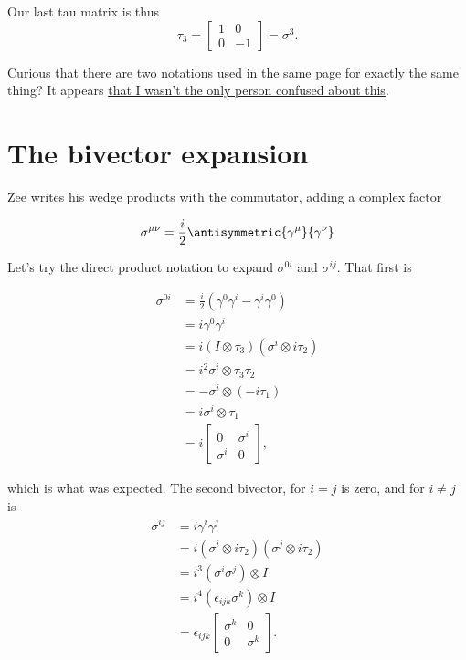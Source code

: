 Our last tau matrix is thus
\begin{equation}\label{eqn:zeeTauMatrix:130}
\tau_3 = 
\begin{bmatrix}
1 & 0 \\
0 & -1
\end{bmatrix}
= \sigma^3.
\end{equation}

Curious that there are two notations used in the same page for exactly the same thing?  It appears \href{http://www.physicsforums.com/showthread.php?p=2844657}{that I wasn't the only person confused about this}.

\section{The bivector expansion}

Zee writes his wedge products with the commutator, adding a complex factor

\begin{equation}\label{eqn:zeeTauMatrix:140}
\sigma^{\mu\nu} = \frac{i}{2} \antisymmetric{\gamma^\mu}{\gamma^\nu}
\end{equation}

Let's try the direct product notation to expand $\sigma^{0 i}$ and $\sigma^{ij}$.  That first is

\begin{align*}
\sigma^{0 i} 
&= \frac{i}{2} \left( \gamma^0 \gamma^i - \gamma^i \gamma^0 \right) \\
&= i \gamma^0 \gamma^i \\
&= i (I \otimes \tau_3)(\sigma^i \otimes i \tau_2) \\
&= i^2 \sigma^i \otimes \tau_3\tau_2 \\
&= - \sigma^i \otimes (-i \tau_1) \\
&= i \sigma^i \otimes \tau_1 \\
&= i 
\begin{bmatrix}
0 & \sigma^i \\
\sigma^i & 0
\end{bmatrix},
\end{align*}

which is what was expected.  The second bivector, for $i=j$ is zero, and for $i\ne j$ is
\begin{align*}
\sigma^{i j} 
&= i \gamma^i \gamma^j \\
&= i (\sigma^i \otimes i \tau_2) (\sigma^j \otimes i \tau_2) \\
&= i^3 (\sigma^i \sigma^j) \otimes I \\
&= i^4 (\epsilon_{ijk} \sigma^k) \otimes I \\
&= \epsilon_{ijk} 
\begin{bmatrix}
\sigma^k & 0 \\
0 & \sigma^k
\end{bmatrix}.
\end{align*}

\EndArticle
